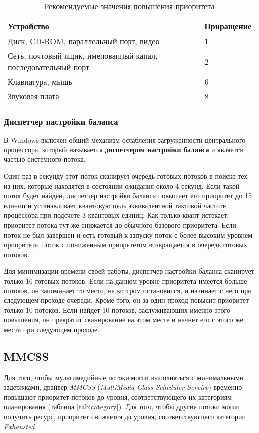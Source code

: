 \begin{table}[!h]
	\caption{Рекомендуемые значения повышения приоритета}
	\begin{center}
		\begin{tabular}{|p{100mm}|l|}
			\hline
			\textbf{Устройство} & \textbf{Приращение} \\\hline
			Диск, CD-ROM, параллельный порт, видео & 1 \\ \hline
			Сеть, почтовый ящик, именованный канал, последовательный порт & 2 \\ \hline
			Клавиатура, мышь & 6 \\ \hline
			Звуковая плата & 8 \\ \hline
		\end{tabular}
	\end{center}
	\label{tab:input-output}
\end{table}

\subsubsection*{Диспетчер настройки баланса}
В Windows включен общий механизм ослабления загруженности центрального процессора, который называется \textbf{диспетчером настройки баланса} и является частью системного потока.

Один раз в секунду этот поток сканирует очередь готовых потоков в поиске тех из них, которые находятся в состоянии ожидания около 4 секунд. Если такой поток будет найден, диспетчер настройки баланса повышает его приоритет до 15 единиц и устанавливает квантовую цель эквивалентной тактовой частоте процессора при подсчете 3 квантовых единиц. Как только квант истекает, приоритет потока тут же снижается до обычного базового приоритета. Если поток не был завершен и есть готовый к запуску поток с более высоким уровнем приоритета, поток с пониженным приоритетом возвращается в очередь готовых потоков.

Для минимизации времени своей работы, диспетчер настройки баланса сканирует только 16 готовых потоков. Если на данном уровне приоритета имеется больше потоков, он запоминает то место, на котором остановился, и начинает с него при следующем проходе очереди. Кроме того, он за один проход повысит приоритет только 10 потоков. Если найдет 10 потоков, заслуживающих именно этого повышения, он прекратит сканирование на этом месте и начнет его с этого же места при следующем проходе.

\subsection*{MMCSS}
Для того, чтобы мультимедийные потоки могли выполняться с минимальными задержками, драйвер \textit{MMCSS} (\textit{MultiMedia Class Scheduler Service}) временно повышают приоритет потоков до уровня, соответствующего их категориям планирования (таблица \ref{tab:category}). Для того, чтобы другие потоки могли получить ресурс, приоритет снижается до уровня, соответствующего категории \textit{Exhausted}.

